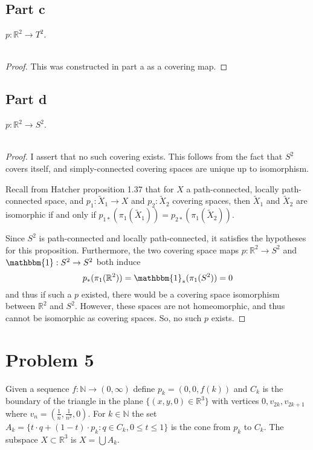 \documentclass[fontsize=11pt]{scrartcl} %
\numberwithin{equation}{section} %
\numberwithin{figure}{section} %
\numberwithin{table}{section} %
\newcommand{\R}{\mathbb{R}}
\newcommand{\N}{\mathbb{N}}
\begin{document}
\subsection*{Part c}
$p:\R^2\to T^2$.
\\
\\
\begin{proof}
    This was constructed in part a as a covering map.
\end{proof}

\subsection*{Part d}
$p:\R^2\to S^2$.
\\
\\
\begin{proof}
    I assert that no such covering exists. This follows from the fact that $S^2$
    covers itself, and simply-connected covering spaces are unique up to
    isomorphism.

    Recall from Hatcher proposition 1.37 that for $X$ a
    path-connected, locally path-connected space, and $p_1:\tilde{X}_1\to X$ and
    $p_2:\tilde{X}_2$ covering spaces, then $\tilde{X}_1$ and $\tilde{X}_2$ are
    isomorphic if and only if $p_{1*}(\pi_1(\tilde{X}_1)) =
    p_{2*}(\pi_1(\tilde{X}_2))$.

    Since $S^2$ is path-connected and locally path-connected, it satisfies the
    hypotheses for this proposition. Furthermore, the two covering space maps
    $p:\R^2\to S^2$ and $\mathbbm{1}:S^2\to S^2$ both induce
    \[
        p_*(\pi_1(\R^2)) = \mathbbm{1}_*(\pi_1(S^2)) = 0
    \]
    and thus if such a $p$ existed, there would be a covering space isomorphism
    between $\R^2$ and $S^2$. However, these spaces are not homeomorphic, and
    thus cannot be isomorphic as covering spaces. So, no such $p$ exists.
\end{proof}

\newpage
\section*{Problem 5}
Given a sequence $f:\N\to(0, \infty)$ define $p_k = (0, 0, f(k))$ and $C_k$ is
the boundary of the triangle in the plane $\{(x, y, 0) \in \R^3\}$ with vertices
$0, v_{2k}, v_{2k+1}$ where $v_n = (\frac{1}{n}, \frac{1}{n^2},0)$.
For $k \in \N$ the set
$A_k = \{t\cdot q + (1 - t) \cdot p_k : q \in C_k, 0 \leq t \leq 1\}$
is the cone from $p_k$ to $C_k$. The subspace $X \subset \R^3$
is $X=\bigcup A_k$.
\end{document}
